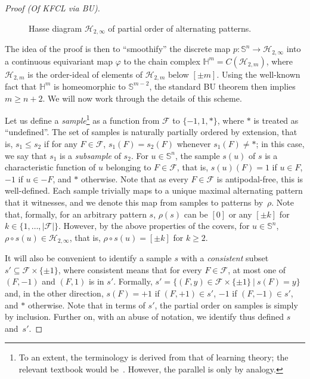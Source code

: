 \documentclass{article} %
\newcommand{\F}{\mathcal{F}}
\renewcommand{\H}{\mathcal{H}}
\newcommand{\HH}{\mathbb{H}}
\renewcommand{\SS}{\mathbb{S}}
\begin{document}
\begin{proof}[Proof (Of KFCL via BU)]
\begin{figure}[hbt]
	    \caption{Hasse diagram $\H_{2, \infty}$ of partial order of alternating patterns.}
	    \label{fig-hasse}
	\end{figure}
	
	The idea of the proof is then to ``smoothify'' the discrete map $p\colon \SS^n \rightarrow \H_{2, \infty}$ into a continuous equivariant map $\varphi$ to the chain complex $\HH^m = C(\H_{2, m})$, where $\H_{2, m}$ is the order-ideal of elements of $\H_{2, m}$ below $[\pm m]$. Using the well-known fact that $\HH^m$ is homeomorphic to $\SS^{m-2}$, the standard BU theorem then implies $m\geq n+2$. We will now work through the details of this scheme.
	
	Let us define a \emph{sample}\footnote{To an extent, the terminology is derived from that of learning theory; the relevant textbook would be~\cite{shays14}. However, the parallel is only by analogy.} as a function from $\F$ to $\{-1, 1, *\}$, where $*$ is treated as ``undefined''. The set of samples is naturally partially ordered by extension, that is, $s_1 \leq s_2$ if for any $F\in \F$, $s_1(F) = s_2(F)$ whenever $s_1(F)\neq *$; in this case, we say that $s_1$ is a \emph{subsample} of $s_2$.  For $u\in \SS^n$, the sample $s(u)$ of $s$ is a characteristic function of $u$ belonging to $F\in \F$, that is, $s(u)(F) = 1$ if $u\in F$, $-1$ if $u\in -F$, and $*$ otherwise. Note that as every $F\in \F$ is antipodal-free, this is well-defined. Each sample trivially maps to a unique maximal alternating pattern that it witnesses, and we denote this map from samples to patterns by~$\rho$. Note that, formally, for an arbitrary pattern $s$, $\rho(s)$ can be $[0]$ or any $[\pm k]$ for $k\in \{1, \dots, |\F|\}$. However, by the above properties of the covers, for $u\in \SS^n$, $\rho\circ s(u) \in \H_{2, \infty}$, that is, $\rho\circ s(u) = [\pm k]$ for $k \geq 2$.
	
	It will also be convenient to identify a sample $s$ with a \emph{consistent} subset $s' \subseteq \F\times \{\pm 1\}$, where consistent means that for every $F\in \F$, at most one of $(F, -1)$ and $(F, 1)$ is in $s'$. Formally, $s' = \{(F, y)\in \F\times \{\pm 1\} ~|~ s(F) = y\}$ and, in the other direction, $s(F) = +1$ if $(F, +1)\in s'$, $-1$ if $(F, -1)\in s'$, and $*$ otherwise. Note that in terms of $s'$, the partial order on samples is simply by inclusion. Further on, with an abuse of notation, we identify thus defined $s$ and~$s'$.
	

\end{proof}
\end{document}

